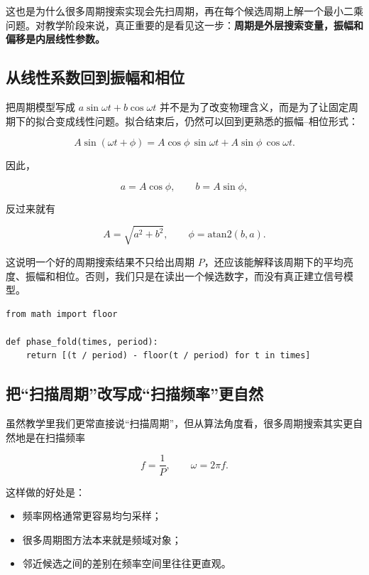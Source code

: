 这也是为什么很多周期搜索实现会先扫周期，再在每个候选周期上解一个最小二乘问题。对教学阶段来说，真正重要的是看见这一步：\textbf{周期是外层搜索变量，振幅和偏移是内层线性参数。}

\subsection{从线性系数回到振幅和相位}

把周期模型写成 $a\sin\omega t + b\cos\omega t$ 并不是为了改变物理含义，而是为了让固定周期下的拟合变成线性问题。拟合结束后，仍然可以回到更熟悉的振幅--相位形式：

\[
A\sin(\omega t+\phi)
= A\cos\phi\,\sin\omega t + A\sin\phi\,\cos\omega t.
\]

因此，

\[
a = A\cos\phi,\qquad b = A\sin\phi,
\]

反过来就有

\[
A = \sqrt{a^2+b^2},
\qquad
\phi = \mathrm{atan2}(b,a).
\]

这说明一个好的周期搜索结果不只给出周期 $P$，还应该能解释该周期下的平均亮度、振幅和相位。否则，我们只是在读出一个候选数字，而没有真正建立信号模型。

\begin{examplebox}[最小相位折叠函数]
\begin{lstlisting}[style=pythonstyle]
from math import floor

def phase_fold(times, period):
    return [(t / period) - floor(t / period) for t in times]
\end{lstlisting}
\end{examplebox}

\subsection{把“扫描周期”改写成“扫描频率”更自然}

虽然教学里我们更常直接说“扫描周期”，但从算法角度看，很多周期搜索其实更自然地是在扫描频率

\[
f = \frac{1}{P},
\qquad
\omega = 2\pi f.
\]

这样做的好处是：

\begin{itemize}
    \item 频率网格通常更容易均匀采样；
    \item 很多周期图方法本来就是频域对象；
    \item 邻近候选之间的差别在频率空间里往往更直观。
\end{itemize}

